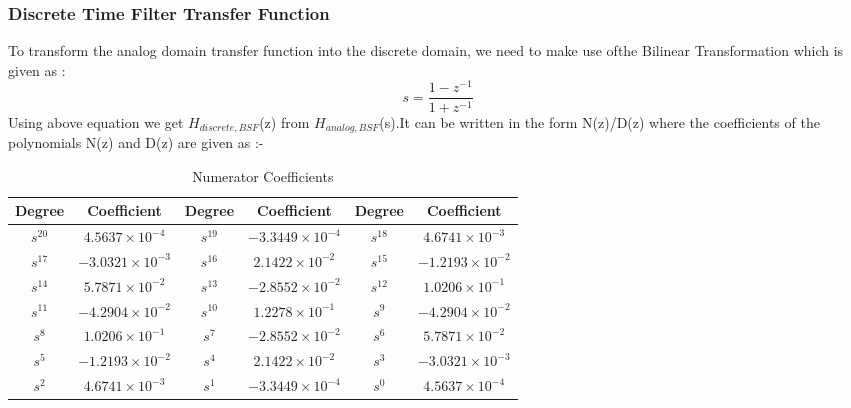 \documentclass{article}
\begin{document}
\subsubsection{Discrete Time Filter Transfer Function}
To transform the analog domain transfer function into the discrete domain, we need to make use ofthe Bilinear Transformation which is given as :
\begin{equation*}
    s = \frac{1 - z^{-1}}{1 + z^{-1}}
\end{equation*}
Using  above  equation  we  get $H_{discrete,BSF}$(z)  from $H_{analog,BSF}$(s).It  can  be  written  in  the  form N(z)/D(z) where the coefficients of the polynomials N(z) and D(z) are given as :-

\begin{table}[H]
    \centering
    \begin{adjustwidth}{0cm}{}
    \caption{Numerator Coefficients}
    \begin{tabular}{|c|c|c|c|c|c|}
        \hline
        Degree & Coefficient & Degree & Coefficient & Degree & Coefficient \\
        \hline
        $s^{20}$ & $4.5637 \times 10^{-4}$ & $s^{19}$ & $-3.3449 \times 10^{-4}$ & $s^{18}$ & $4.6741 \times 10^{-3}$ \\
        \hline
        $s^{17}$ & $-3.0321 \times 10^{-3}$ & $s^{16}$ & $2.1422 \times 10^{-2}$ & $s^{15}$ & $-1.2193 \times 10^{-2}$ \\
        \hline
        $s^{14}$ & $5.7871 \times 10^{-2}$ & $s^{13}$ & $-2.8552 \times 10^{-2}$ & $s^{12}$ & $1.0206 \times 10^{-1}$ \\
        \hline
        $s^{11}$ & $-4.2904 \times 10^{-2}$ & $s^{10}$ & $1.2278 \times 10^{-1}$ & $s^{9}$ & $-4.2904 \times 10^{-2}$ \\
        \hline
        $s^{8}$ & $1.0206 \times 10^{-1}$ & $s^{7}$ & $-2.8552 \times 10^{-2}$ & $s^{6}$ & $5.7871 \times 10^{-2}$ \\
        \hline
        $s^{5}$ & $-1.2193 \times 10^{-2}$ & $s^{4}$ & $2.1422 \times 10^{-2}$ & $s^{3}$ & $-3.0321 \times 10^{-3}$ \\
        \hline
        $s^{2}$ & $4.6741 \times 10^{-3}$ & $s^{1}$ & $-3.3449 \times 10^{-4}$ & $s^{0}$ & $4.5637 \times 10^{-4}$ \\
        \hline
    \end{tabular}
    \end{adjustwidth}
\end{table}
\end{document}
